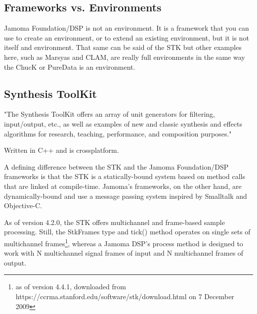\documentclass[twoside,10pt]{article}
\begin{document}
%

\subsection {Frameworks vs. Environments}


Jamoma Foundation/DSP is not an environment.  It is a framework that you can use to create an environment, or to extend an existing environment, but it is not itself and environment.  That same can be said of the STK but other examples here, such as Marsyas and CLAM, are really full environments in the same way the ChucK or PureData is an environment.


\subsection{Synthesis ToolKit} %

"The Synthesis ToolKit offers an array of unit generators for filtering, input/output, etc., as well as examples of new and classic synthesis and effects algorithms for research, teaching, performance, and composition purposes."\cite{Cook:1999}

Written in C++ and is crossplatform.


A defining difference between the STK and the Jamoma Foundation/DSP frameworks is that the STK is a statically-bound system based on method calls that are linked at compile-time.  Jamoma's frameworks, on the other hand, are dynamically-bound and use a message passing system inspired by Smalltalk\cite{Krasner:1988} and Objective-C\cite{Cox:1986}.

As of version 4.2.0, the STK offers multichannel and frame-based sample processing\cite{Scavone:2005}. Still, the StkFrames type and tick() method operates on single sets of multichannel frames\footnote{as of version 4.4.1, downloaded from https://ccrma.stanford.edu/software/stk/download.html on 7 December 2009}, whereas a Jamoma DSP's process method is designed to work with N multichannel signal frames of input and N multichannel frames of output.
\end{document}
